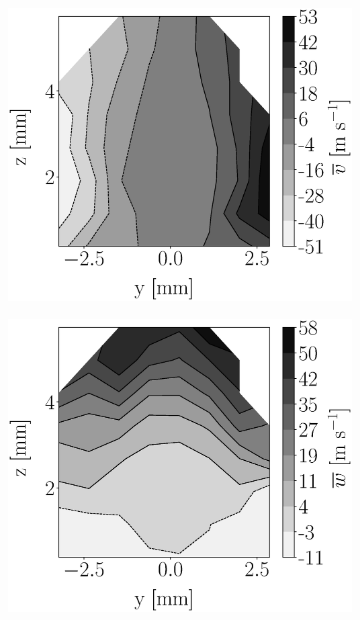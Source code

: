 \begin{figure}[h!]
\begin{subfigure}[b]{0.22\textwidth}
\end{subfigure}
   \hspace{0.17in}
\begin{subfigure}[b]{0.22\textwidth}
	\centering
   \includegraphics[scale=0.17]{./part2_developments/figures_ch5_resolved_JICF/injectors_SLI/uG100_dx10_x05_uy_mean_map.eps}
\end{subfigure}
   \hspace{0.17in}
\begin{subfigure}[b]{0.22\textwidth}
	\centering
   \includegraphics[scale=0.17]{./part2_developments/figures_ch5_resolved_JICF/injectors_SLI/uG100_dx10_x05_uz_mean_map.eps}
\end{subfigure}


\end{figure}
